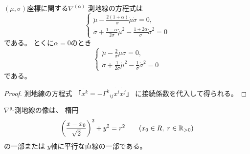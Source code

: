 \documentclass[report]{jlreq}
\begin{document}
\begin{proposition}[測地線方程式]
    $(\mu, \sigma)$座標に関する$\nabla^{(\alpha)}$-測地線の方程式は
    \begin{equation}
        \begin{cases}
            \ddot{\mu}
                - \frac{2 (1 + \alpha)}{\sigma} \dot{\mu} \dot{\sigma}
                = 0,
                \\
            \ddot{\sigma}
                + \frac{1 - \alpha}{2 \sigma} \dot{\mu}^2
                - \frac{1 + 2 \alpha}{\sigma} \dot{\sigma}^2
                = 0
        \end{cases}
    \end{equation}
    である。
    とくに$\alpha = 0$のとき
    \begin{equation}
        \begin{cases}
            \ddot{\mu}
                - \frac{2}{\sigma} \dot{\mu} \dot{\sigma}
                = 0,
                \\
            \ddot{\sigma}
                + \frac{1}{2 \sigma} \dot{\mu}^2
                - \frac{1}{\sigma} \dot{\sigma}^2
                = 0
        \end{cases}
    \end{equation}
    である。
\end{proposition}

\begin{proof}
    測地線の方程式
    「$\ddot{x^k} = - {\Gamma^k}_{ij} \dot{x^i} \dot{x^j}$」
    に接続係数を代入して得られる。
\end{proof}

\begin{proposition}
    $\nabla^g$-測地線の像は、
    楕円
    \begin{equation}
        \left({
            \frac{x - x_0}{\sqrt{2}}
        }\right)^2
            + y^2 = r^2
            \qquad
            (x_0 \in R, \; r \in \mathbb{R}_{> 0})
    \end{equation}
    の一部または
    $y$軸に平行な直線の一部である。
\end{proposition}
\end{document}
